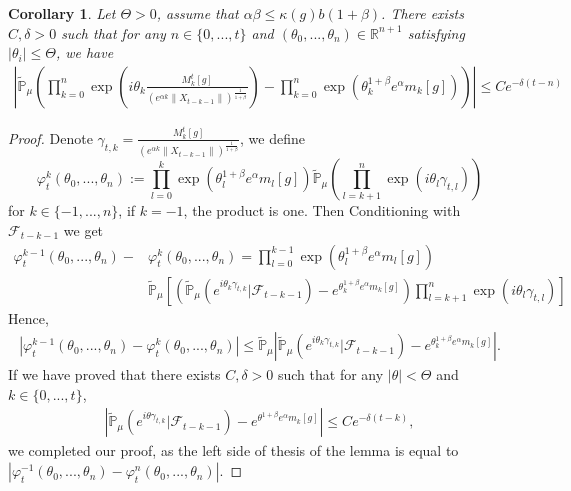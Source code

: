 \documentclass[12pt, a4paper]{amsart}
\newtheorem{cor}[thm]{Corollary}
\theoremstyle{definition}
\numberwithin{equation}{section}
\begin{document}
\begin{cor}\label{corollary31}
Let $\Theta>0$, assume that $\alpha\beta\leq\kappa(g)b(1+\beta)$. There exists $C,\delta>0$ such that for any $n \in \{0,...,t\}$ and $(\theta_0,...,\theta_n)\in \mathbb{R}^{n+1}$ satisfying $|\theta_i|\leq \Theta$, we have
\begin{align*}
    \left|\mathbb{\tilde{P}}_{\mu}\left(\prod_{k=0}^n\exp(i\theta_k \frac {M_k^t[g]}{(e^{\alpha k}\|X_{t-k-1}\|)^\frac{1}{1+\beta}})-\prod_{k=0}^n\exp(\theta_k^{1+\beta}e^{\alpha}m_k[g])\right)\right|\leq Ce^{-\delta(t-n)}
\end{align*}
\end{cor}
\begin{proof}
    Denote $\gamma_{t,k}=\frac {M_k^t[g]}{(e^{\alpha k}\|X_{t-k-1}\|)^\frac{1}{1+\beta}} $, we define 
    $$\varphi^k_t(\theta_0,...,\theta_n):=\prod_{l=0}^{k}\exp\left(\theta_l^{1+\beta}e^{\alpha}m_l[g]\right)\mathbb{\tilde{P}}_{\mu}\left(\prod_{l=k+1}^{n}\exp\left(i\theta_l\gamma_{t,l}\right)\right)$$
    for $k\in\{-1,...,n\}$, if $k=-1$, the product is one. Then Conditioning with $\mathcal{F}_{t-k-1}$ we get
    \begin{align*}
        \varphi^{k-1}_t(\theta_0,...,\theta_n)-&\varphi^{k}_t(\theta_0,...,\theta_n)=\prod_{l=0}^{k-1}\exp\left(\theta_l^{1+\beta}e^{\alpha}m_l[g]\right)\\
        &\mathbb{\tilde{P}}_{\mu}\left[\left(\mathbb{\tilde{P}}_{\mu}\left(e^{i\theta_k \gamma_{t,k}}|\mathcal{F}_{t-k-1}\right)-e^{\theta_k^{1+\beta}e^{\alpha}m_k[g]}\right)\prod_{l=k+1}^n\exp(i\theta_l \gamma_{t,l})\right]
    \end{align*}
    Hence,
    \begin{align*}
        \left|\varphi^{k-1}_t(\theta_0,...,\theta_n)-\varphi^{k}_t(\theta_0,...,\theta_n)\right| \leq \mathbb{\tilde{P}}_{\mu}\left|\mathbb{\tilde{P}}_{\mu}\left(e^{i\theta_k \gamma_{t,k}}|\mathcal{F}_{t-k-1}\right)-e^{\theta_k^{1+\beta}e^{\alpha}m_k[g]}\right|.
    \end{align*}
    If we have proved that there exists $C,\delta>0$ such that for any $|\theta|<\Theta$ and $k\in \{0,...,t\}$,
    \begin{align}
        \left|\mathbb{\tilde{P}}_{\mu}\left(e^{i\theta \gamma_{t,k}}|\mathcal{F}_{t-k-1}\right)-e^{\theta^{1+\beta}e^{\alpha}m_k[g]}\right|\leq C e^{-\delta(t-k)},
    \end{align}
    we completed our proof, as the left side of thesis of the lemma is equal to $\left|\varphi^{-1}_t(\theta_0,...,\theta_n)-\varphi^{n}_t(\theta_0,...,\theta_n)\right|$.
    

\end{proof}
\end{document}
